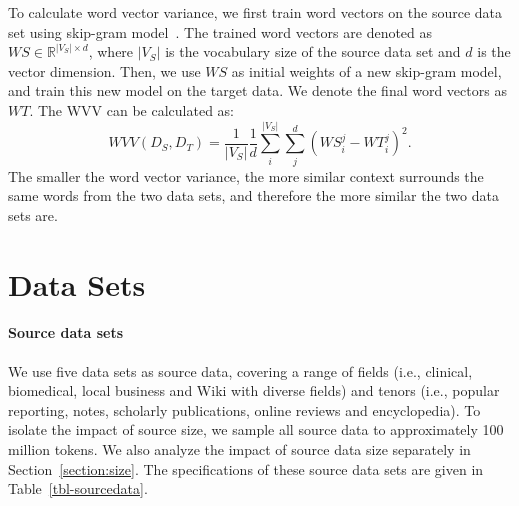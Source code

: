 \documentclass[11pt,a4paper]{article}
\begin{document}
To calculate word vector variance, we first train word vectors on the source data set using skip-gram model~\citep{Mikolov:Chen:arXiv:2013}. 
The trained word vectors are denoted as $WS \in \mathbb{R}^{|V_S| \times d}$, where $|V_S|$ is the vocabulary size of the source data set and $d$ is the vector dimension. 
Then, we use $WS$ as initial weights of a new skip-gram model, and train this new model on the target data. 
We denote the final word vectors as $WT$. 
The WVV can be calculated as:
\[
WVV(D_S, D_T) = \frac{1}{|V_S|} \frac{1}{d} \sum_i^{|V_S|} \sum_j^d (WS^j_i - WT^j_i)^2.
\]
The smaller the word vector variance, the more similar context surrounds the same words from the two data sets, and therefore the more similar the two data sets are.

\section{Data Sets}
\paragraph{Source data sets}
We use five data sets as source data, covering a range of fields (i.e., clinical, biomedical, local business and Wiki with diverse fields) and tenors (i.e., popular reporting, notes, scholarly publications, online reviews and encyclopedia). 
To isolate the impact of source size, we sample all source data to approximately 100 million tokens. 
We also analyze the impact of source data size separately in Section~\ref{section:size}. 
The specifications of these source data sets are given in Table~\ref{tbl-sourcedata}.
\end{document}
